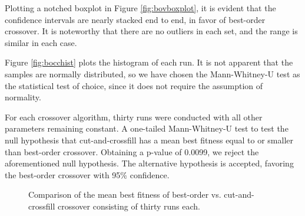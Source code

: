 \documentclass[12pt,twocolumn,oneside]{osajnl}
\begin{document}
Plotting a notched boxplot in Figure \ref{fig:bovboxplot}, it is evident that the confidence intervals are nearly stacked end to end, in favor of best-order crossover. It is noteworthy that there are no outliers in each set, and the range is similar in each case.

Figure \ref{fig:bocchist} plots the histogram of each run. It is not apparent that the samples are normally distributed, so we have chosen the Mann-Whitney-U test as the statistical test of choice, since it does not require the assumption of normality.

For each crossover algorithm, thirty runs were conducted with all other parameters remaining constant. A one-tailed Mann-Whitney-U test to test the null hypothesis that cut-and-crossfill has a mean best fitness equal to or smaller than best-order crossover. Obtaining a p-value of 0.0099, we reject the aforementioned null hypothesis. The alternative hypothesis is accepted, favoring the best-order crossover with 95\% confidence.

\begin{figure}[htbp]
\centering
{}
\caption{Comparison of the mean best fitness of best-order vs. cut-and-crossfill crossover consisting of thirty runs each.}
\label{fig:bovcc}
\end{figure}
\end{document}

